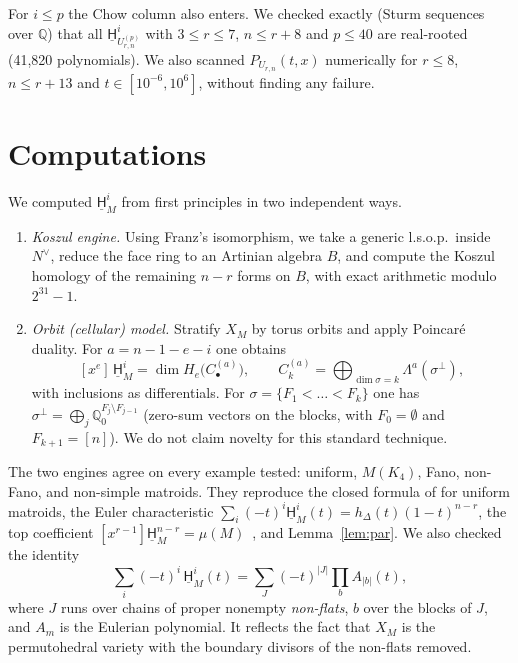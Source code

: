 \documentclass[a4paper,envcountsame,runningheads]{llncs}
\newcommand{\uH}{\underline{\mathsf H}}
\newcommand{\Q}{\mathbb Q}
\begin{document}
For $i\le p$ the Chow column also enters. We checked exactly (Sturm sequences over $\Q$) that all $\uH^i_{U^{(p)}_{r,n}}$ with $3\le r\le 7$, $n\le r+8$ and $p\le 40$ are real-rooted (41{,}820 polynomials). We also scanned $P_{U_{r,n}}(t,x)$ numerically for $r\le 8$, $n\le r+13$ and $t\in[10^{-6},10^{6}]$, without finding any failure.

\section{Computations}\label{sec:computations}

We computed $\uH^i_M$ from first principles in two independent ways.
\begin{enumerate}
\item \emph{Koszul engine.} Using Franz's isomorphism, we take a generic l.s.o.p.\ inside $N^\vee$, reduce the face ring to an Artinian algebra $B$, and compute the Koszul homology of the remaining $n-r$ forms on $B$, with exact arithmetic modulo $2^{31}-1$.
\item \emph{Orbit (cellular) model.} Stratify $X_M$ by torus orbits and apply Poincar\'e duality. For $a=n-1-e-i$ one obtains
\[
[x^e]\,\uH^i_M=\dim H_e\big(C^{(a)}_\bullet\big),\qquad C^{(a)}_k=\bigoplus_{\dim\sigma=k}\Lambda^a(\sigma^\perp),
\]
with inclusions as differentials. For $\sigma=\{F_1<\dots<F_k\}$ one has $\sigma^\perp=\bigoplus_{j}\Q_0^{F_j\setminus F_{j-1}}$ (zero-sum vectors on the blocks, with $F_0=\emptyset$ and $F_{k+1}=[n]$). We do not claim novelty for this standard technique.
\end{enumerate}
The two engines agree on every example tested: uniform, $M(K_4)$, Fano, non-Fano, and non-simple matroids. They reproduce the closed formula of \cite[Lemma~6.2]{BV} for uniform matroids, the Euler characteristic $\sum_i(-t)^i\uH^i_M(t)=h_\Delta(t)(1-t)^{n-r}$, the top coefficient $[x^{r-1}]\uH^{n-r}_M=\mu(M)$~\cite{Binder}, and Lemma~\ref{lem:par}. We also checked the identity
\[
\textstyle\sum_i(-t)^i\,\uH^i_M(t)=\sum_{J}(-t)^{|J|}\prod_{b}A_{|b|}(t),
\]
where $J$ runs over chains of proper nonempty \emph{non-flats}, $b$ over the blocks of $J$, and $A_m$ is the Eulerian polynomial. It reflects the fact that $X_M$ is the permutohedral variety with the boundary divisors of the non-flats removed.
\end{document}
